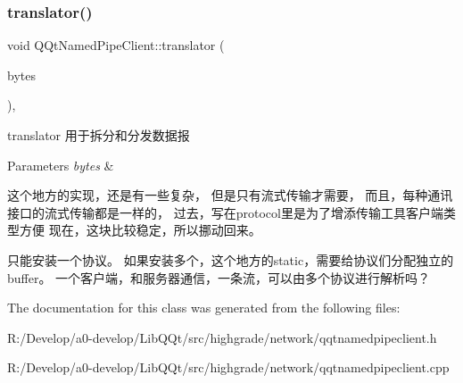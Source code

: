 \subsubsection{\texorpdfstring{translator()}{translator()}}
{\footnotesize\ttfamily void Q\+Qt\+Named\+Pipe\+Client\+::translator (\begin{DoxyParamCaption}\item[{const Q\+Byte\+Array \&}]{bytes }\end{DoxyParamCaption})\hspace{0.3cm}{\ttfamily [protected]}, {\ttfamily [virtual]}}



translator 用于拆分和分发数据报 


\begin{DoxyParams}{Parameters}
{\em bytes} & \\
\hline
\end{DoxyParams}
这个地方的实现，还是有一些复杂， 但是只有流式传输才需要， 而且，每种通讯接口的流式传输都是一样的， 过去，写在protocol里是为了增添传输工具客户端类型方便 现在，这块比较稳定，所以挪动回来。

只能安装一个协议。 如果安装多个，这个地方的static，需要给协议们分配独立的buffer。 一个客户端，和服务器通信，一条流，可以由多个协议进行解析吗？

The documentation for this class was generated from the following files\+:\begin{DoxyCompactItemize}
\item 
R\+:/\+Develop/a0-\/develop/\+Lib\+Q\+Qt/src/highgrade/network/qqtnamedpipeclient.\+h\item 
R\+:/\+Develop/a0-\/develop/\+Lib\+Q\+Qt/src/highgrade/network/qqtnamedpipeclient.\+cpp\end{DoxyCompactItemize}
